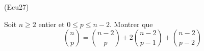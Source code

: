 \begin{tiny}(Ecu27)\end{tiny} Soit $n\geq 2$ entier et $0\leq p \leq n-2$. Montrer que
\begin{displaymath}
 \binom{n}{p} = \binom{n-2}{p} + 2\binom{n-2}{p-1} + \binom{n-2}{p-2}
\end{displaymath}

